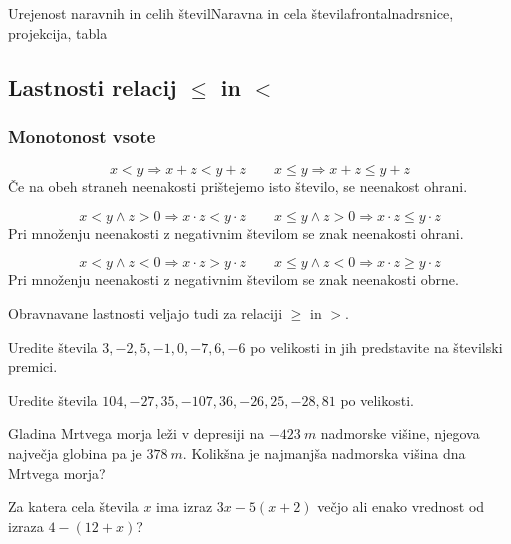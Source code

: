 \begin{priprava}{6}{}{Urejenost naravnih in celih števil}{Naravna in cela števila}{frontalna}{drsnice, projekcija, tabla}
\begin{multicols}{2}
        \end{multicols}



        \subsection{Lastnosti relacij $\leq$ in $<$}
        \subsubsection*{Monotonost vsote}
        $$x<y \Rightarrow x+z<y+z \quad \quad x\leq y \Rightarrow x+z\leq y+z$$
        Če na obeh straneh neenakosti prištejemo isto število, se neenakost ohrani.
    \newline

    
        $$x<y \land z>0 \Rightarrow x\cdot z<y\cdot z \quad \quad x\leq y \land z>0 \Rightarrow x\cdot z\leq y\cdot z$$
        Pri množenju neenakosti z negativnim številom se znak neenakosti ohrani.
        \newline

    
        $$x<y \land z<0 \Rightarrow x\cdot z>y\cdot z \quad \quad x\leq y \land z<0 \Rightarrow x\cdot z\geq y\cdot z$$
        Pri množenju neenakosti z negativnim številom se znak neenakosti obrne.
        \newline ~
        \newline

    
        Obravnavane lastnosti veljajo tudi za relaciji $\geq$ in $>$.
        \newline ~
        \newline ~
        \newline





        \begin{naloga}
            Uredite števila $3, -2, 5, -1, 0, -7, 6, -6$ po velikosti in jih predstavite na številski premici.
        \end{naloga}

        \begin{naloga}
            Uredite števila $104, -27, 35, -107, 36, -26, 25, -28, 81$ po velikosti.
        \end{naloga}

        \begin{naloga}
            Gladina Mrtvega morja leži v depresiji na $-423~m$ nadmorske višine, njegova največja globina pa je $378~m$.
            Kolikšna je najmanjša nadmorska višina dna Mrtvega morja?
        \end{naloga}

        \begin{naloga}
            Za katera cela števila $x$ ima izraz $3x-5(x+2)$ večjo ali enako vrednost od izraza $4-(12+x)$?
        \end{naloga}



\end{priprava}